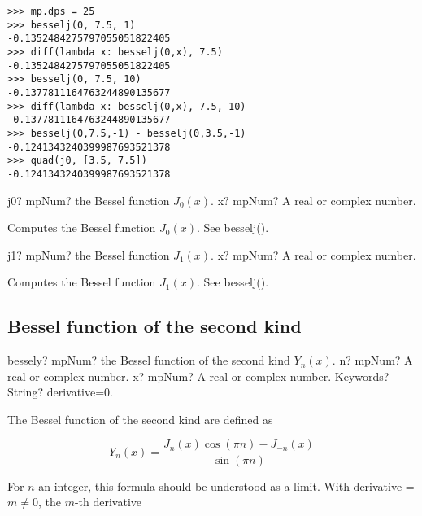 \begin{lstlisting}
>>> mp.dps = 25
>>> besselj(0, 7.5, 1)
-0.1352484275797055051822405
>>> diff(lambda x: besselj(0,x), 7.5)
-0.1352484275797055051822405
>>> besselj(0, 7.5, 10)
-0.1377811164763244890135677
>>> diff(lambda x: besselj(0,x), 7.5, 10)
-0.1377811164763244890135677
>>> besselj(0,7.5,-1) - besselj(0,3.5,-1)
-0.1241343240399987693521378
>>> quad(j0, [3.5, 7.5])
-0.1241343240399987693521378
\end{lstlisting}


\vspace{0.6cm}

\begin{mpFunctionsExtract}
	\mpFunctionOne
	{j0? mpNum? the Bessel function $J_0(x)$.}
	{x? mpNum? A real or complex number.}
\end{mpFunctionsExtract}


Computes the Bessel function $J_0(x)$. See besselj().

\vspace{0.6cm}

\begin{mpFunctionsExtract}
	\mpFunctionOne
	{j1? mpNum? the Bessel function $J_1(x)$.}
	{x? mpNum? A real or complex number.}
\end{mpFunctionsExtract}

Computes the Bessel function $J_1(x)$. See besselj().



\subsection{Bessel function of the second kind}

\begin{mpFunctionsExtract}
	\mpFunctionThree
	{bessely? mpNum? the Bessel function of the second kind $Y_n(x)$.}
	{n? mpNum? A real or complex number.}
	{x? mpNum? A real or complex number.}	
	{Keywords? String? derivative=0.}	
\end{mpFunctionsExtract}


The Bessel function of the second kind are defined as

\begin{equation}
Y_n(x)=\frac{J_n(x) \cos(\pi n) - J_{-n}(x)}{\sin(\pi n)}
\end{equation}

For $n$ an integer, this formula should be understood as a limit. With derivative = $m \neq 0$, the $m$-th derivative 


